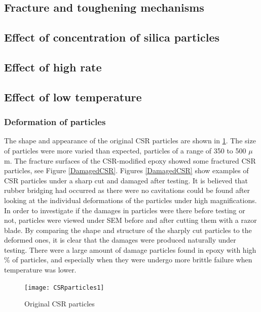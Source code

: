 \documentclass[numbers=noendperiod,chapterprefix=on]{icldt} %
\begin{document}
{\subsection{Fracture and toughening mechanisms}

\subsection{Effect of concentration of silica particles}

\subsection{Effect of high rate}

\subsection{Effect of low temperature}


\subsubsection{Deformation of particles}
The shape and appearance of the original CSR particles are shown in  \ref{CSRparticles1}. The size of particles were more varied than expected, particles of a range of 350 to 500 $ \mu $m. The fracture surfaces of the CSR-modified epoxy showed some fractured CSR particles, see Figure  \ref{DamagedCSR}. Figures %
\ref{DamagedCSR} show examples of CSR particles under a sharp cut and damaged after testing. It is believed that rubber bridging had occurred as there were no cavitations could be found after looking at the individual deformations of the particles under high magnifications. In order to investigate if the damages in particles were there before testing or not, particles were viewed under SEM before and after cutting them with a razor blade. By comparing the shape and structure of the sharply cut particles to the deformed ones, it is clear that the damages were produced naturally under testing. There were a large amount of damage particles found in epoxy with high \% of particles, and especially when they were undergo more brittle failure when temperature was lower.

\begin{figure}[!htpb]
\centering
\texttt{[image: CSRparticles1]} 
\caption{Original CSR particles}\label{CSRparticles1}
\end{figure}
\FloatBarrier


}
\end{document}
